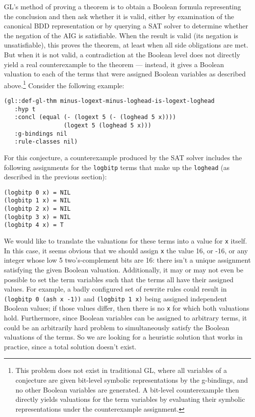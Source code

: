 \documentclass[submission,copyright,creativecommons]{eptcs}
\begin{document}
GL's method of proving a theorem is to obtain a Boolean formula 
representing the conclusion and then ask
whether it is valid, either by examination of the canonical BDD
representation or by querying a SAT solver to determine whether the
negation of the AIG is satisfiable.  When the result is valid (its
negation is unsatisfiable), this proves the theorem, at least 
when all side obligations are met.
  But when it is not valid, a contradiction at the Boolean
level does not directly yield a real counterexample to the theorem ---
instead, it gives a Boolean valuation to each of the terms that were
assigned Boolean variables as described above.\footnote{This problem
  does not exist in traditional GL, where all variables of a
  conjecture are given bit-level symbolic representations by the
  g-bindings, and no other Boolean variables are generated.  A
  bit-level counterexample then directly yields valuations for the
  term variables by evaluating their symbolic representations under
  the counterexample assignment.}
Consider the following example:
\begin{verbatim}
(gl::def-gl-thm minus-logext-minus-loghead-is-logext-loghead
   :hyp t
   :concl (equal (- (logext 5 (- (loghead 5 x))))
                 (logext 5 (loghead 5 x)))
   :g-bindings nil
   :rule-classes nil)
\end{verbatim}
For this conjecture, a counterexample produced by the SAT solver
includes the following assignments for the \texttt{logbitp} terms that
make up the \texttt{loghead} (as described in the previous section):
\begin{verbatim}
(logbitp 0 x) = NIL
(logbitp 1 x) = NIL
(logbitp 2 x) = NIL
(logbitp 3 x) = NIL
(logbitp 4 x) = T
\end{verbatim}
We would
like to translate the valuations for these terms into a value for \texttt{x} itself.  In this
case, it seems obvious that we should assign \texttt{x} the value 16,
or -16, or any integer whose low 5 two's-complement bits are 16: there isn't a
unique assignment satisfying the given Boolean valuation.
Additionally, it may or may not even be possible to set the term
variables such that the terms all have their assigned values.  For
example, a badly configured set of rewrite rules could result in
\texttt{(logbitp 0 (ash x -1))} and \texttt{(logbitp 1 x)} being
assigned independent Boolean values; if those values differ, then
there is no \texttt{x} for which both valuations hold.  Furthermore, since
Boolean variables can be assigned to arbitrary terms, it could be an
arbitrarily hard problem to simultaneously satisfy the Boolean
valuations of the terms.  So we are looking for a heuristic solution
that works in practice, since a total solution doesn't exist.
\end{document}
